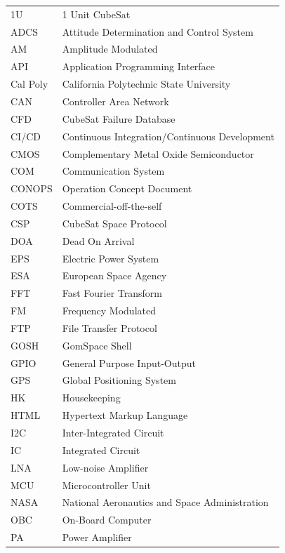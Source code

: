 \documentclass[english,12pt,a4paper,pdftex,elec,utf8]{aaltothesis}
\begin{document}


\begin{tabular}{ll}
1U 		& 1 Unit CubeSat \\
ADCS 	& Attitude Determination and Control System \\
AM 		& Amplitude Modulated \\
API 	& Application Programming Interface \\
Cal Poly	& California Polytechnic State University \\
CAN 	& Controller Area Network \\
CFD 	& CubeSat Failure Database \\
CI/CD 	& Continuous Integration/Continuous Development \\
CMOS 	& Complementary Metal Oxide Semiconductor \\
COM 	& Communication System \\
CONOPS 	& Operation Concept Document \\
COTS 	& Commercial-off-the-self \\
CSP 	& CubeSat Space Protocol \\
DOA 	& Dead On Arrival \\
EPS      & Electric Power System \\
ESA 	& European Space Agency \\
FFT 	& Fast Fourier Transform \\
FM 		& Frequency Modulated \\
FTP 	& File Transfer Protocol \\
GOSH 	& GomSpace Shell \\
GPIO 	& General Purpose Input-Output \\
GPS 	& Global Positioning System \\
HK 		& Housekeeping \\
HTML	& Hypertext Markup Language \\
I2C 	& Inter-Integrated Circuit \\
IC 		& Integrated Circuit \\
LNA 	& Low-noise Amplifier \\
MCU 	& Microcontroller Unit \\
NASA 	& National Aeronautics and Space Administration \\
OBC 	& On-Board Computer \\
PA	 	& Power Amplifier \\

\end{tabular}
\end{document}
